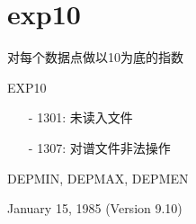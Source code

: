 \section{exp10}
\label{cmd:exp10}

对每个数据点做以10为底的指数

EXP10

\begin{itemize}
\item[-]1301: 未读入文件
\item[-]1307: 对谱文件非法操作
\end{itemize}

DEPMIN, DEPMAX, DEPMEN

January 15, 1985 (Version 9.10)
